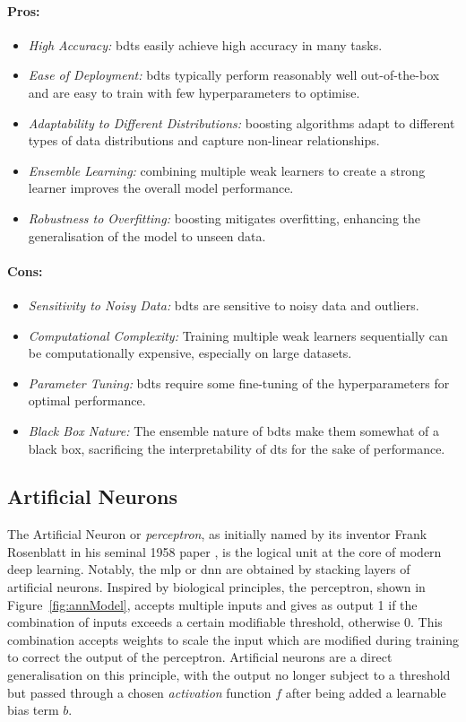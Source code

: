 \paragraph{Pros:}
\begin{itemize}
    \item \textit{High Accuracy:} \glspl{bdt} easily achieve high accuracy in many tasks.
    \item \textit{Ease of Deployment:} \glspl{bdt} typically perform reasonably well out-of-the-box and are easy to train with few hyperparameters to optimise. 
    \item \textit{Adaptability to Different Distributions:} boosting algorithms adapt to different types of data distributions and capture non-linear relationships.
    \item \textit{Ensemble Learning:} combining multiple weak learners to create a strong learner improves the overall model performance. 
    \item \textit{Robustness to Overfitting:} boosting mitigates overfitting, enhancing the generalisation of the model to unseen data. 
\end{itemize}

\paragraph{Cons:}
\begin{itemize}
    \item \textit{Sensitivity to Noisy Data:} \glspl{bdt} are sensitive to noisy data and outliers.
    \item \textit{Computational Complexity:} Training multiple weak learners sequentially can be computationally expensive, especially on large datasets.
    \item \textit{Parameter Tuning:} \glspl{bdt} require some fine-tuning of the hyperparameters for optimal performance.
    \item \textit{Black Box Nature:} The ensemble nature of \glspl{bdt} make them somewhat of a black box, sacrificing the interpretability of \glspl{dt} for the sake of performance.
\end{itemize}

\subsection{Artificial Neurons}
The Artificial Neuron or \textit{perceptron}, as initially named by its inventor Frank Rosenblatt in his seminal 1958 paper \cite{rosenblatt1958perceptron}, is the logical unit at the core of modern deep learning. Notably, the \gls{mlp} or \gls{dnn} are obtained by stacking layers of artificial neurons. Inspired by biological principles, the perceptron, shown in Figure~\ref{fig:annModel}, accepts multiple inputs and gives as output 1 if the combination of inputs exceeds a certain modifiable threshold, otherwise 0. This combination accepts weights to scale the input which are modified during training to correct the output of the perceptron. Artificial neurons are a direct generalisation on this principle, with the output no longer subject to a threshold but passed through a chosen \textit{activation} function $f$ after being added a learnable bias term $b$. 

